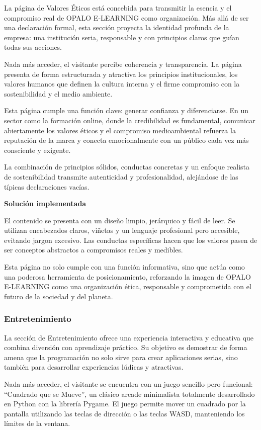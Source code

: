 \documentclass[11.5pt]{article}
\begin{document}
	La página de Valores Éticos está concebida para transmitir la esencia y el compromiso real de OPALO E-LEARNING como organización. Más allá de ser una declaración formal, esta sección proyecta la identidad profunda de la empresa: una institución seria, responsable y con principios claros que guían todas sus acciones.
	
	Nada más acceder, el visitante percibe coherencia y transparencia. La página presenta de forma estructurada y atractiva los principios institucionales, los valores humanos que definen la cultura interna y el firme compromiso con la sostenibilidad y el medio ambiente.
	
	Esta página cumple una función clave: generar confianza y diferenciarse. En un sector como la formación online, donde la credibilidad es fundamental, comunicar abiertamente los valores éticos y el compromiso medioambiental refuerza la reputación de la marca y conecta emocionalmente con un público cada vez más consciente y exigente.
	
	La combinación de principios sólidos, conductas concretas y un enfoque realista de sostenibilidad transmite autenticidad y profesionalidad, alejándose de las típicas declaraciones vacías.
	
	\noindent\textbf{{\large Solución implementada}}
	
	El contenido se presenta con un diseño limpio, jerárquico y fácil de leer. Se utilizan encabezados claros, viñetas y un lenguaje profesional pero accesible, evitando jargon excesivo. Las conductas específicas hacen que los valores pasen de ser conceptos abstractos a compromisos reales y medibles.
	
	Esta página no solo cumple con una función informativa, sino que actúa como una poderosa herramienta de posicionamiento, reforzando la imagen de OPALO E-LEARNING como una organización ética, responsable y comprometida con el futuro de la sociedad y del planeta.
	
	\subsubsection{Entretenimiento}
	
	La sección de Entretenimiento ofrece una experiencia interactiva y educativa que combina diversión con aprendizaje práctico. Su objetivo es demostrar de forma amena que la programación no solo sirve para crear aplicaciones serias, sino también para desarrollar experiencias lúdicas y atractivas.
	
	Nada más acceder, el visitante se encuentra con un juego sencillo pero funcional: “Cuadrado que se Mueve”, un clásico arcade minimalista totalmente desarrollado en Python con la librería Pygame. El juego permite mover un cuadrado por la pantalla utilizando las teclas de dirección o las teclas WASD, manteniendo los límites de la ventana.
	
\end{document}
